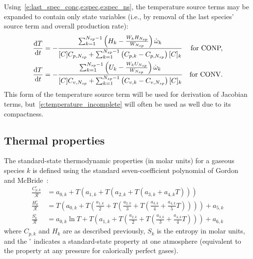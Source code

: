 \documentclass[12pt]{article}
\newcommand{\ns}{N_{sp}}
\newcommand{\conp}{CONP}
\newcommand{\conv}{CONV}
\newcommand{\dconp}{\ifmmode\text{for \conp,}\else for \conp,\fi}
\newcommand{\dconv}{\ifmmode\text{for \conv,}\else for \conv.\fi}
\begin{document}
Using~\cref{e:last_spec_conc,e:spec,e:spec_ns}, the temperature source terms may be expanded to contain only state variables (i.e., by removal of the last species' source term and overall production rate):
\begin{subequations}
\label{e:temperature_complete}
\begin{align}
\frac{\text{d} T }{\text{d} t } &= - \frac{\sum_{k=1}^{\ns  - 1} \left(H_{k} - \frac{W_{k} H_{\ns}}{W_{\ns}}\right) \dot{\omega}_{k}}{[C] {C_{p,\ns}} + \sum_{k=1}^{\ns  - 1} \left({C_{p, k}} - {C_{p,\ns}}\right) [C]_{k}} &\text{\dconp}\\
\frac{\text{d} T }{\text{d} t } &= - \frac{\sum_{k=1}^{\ns  - 1} \left(U_{k} - \frac{W_{k} U_{\ns}}{W_{\ns}}\right) \dot{\omega}_{k}}{[C] {C_{v,\ns}} + \sum_{k=1}^{\ns  - 1} \left({C_{v, k}} - {C_{v,\ns}}\right) [C]_{k}} &\text{\dconv}
\end{align}
\end{subequations}
This form of the temperature source term will be used for derivation of Jacobian terms, but~\cref{e:temperature_incomplete} will often be used as well due to its compactness.

\subsection{Thermal properties}
The standard-state thermodynamic properties (in molar units) for a gaseous species $k$ is defined using the standard seven-coefficient polynomial of Gordon and McBride~\cite{gordon1994computer}:
\begin{align}
\frac{C_{p,k}^{\circ}}{\mathcal{R}} &= a_{0,k} + T \left( a_{1,k} + T \left( a_{2,k} + T \left( a_{3,k} + a_{4,k} T \right) \right) \right) \label{e:cpk} \\
\frac{H_k^{\circ}}{\mathcal{R}} &= T \left( a_{0,k} + T \left( \frac{a_{1,k}}{2} + T \left( \frac{a_{2,k}}{3} + T \left( \frac{a_{3,k}}{4} + \frac{a_{4,k}}{5} T \right) \right) \right) \right) + a_{5,k} \label{e:hk} \\
\frac{S_k^{\circ}}{\mathcal{R}} &= a_{0,k} \ln T + T \left( a_{1,k} + T \left( \frac{a_{2,k}}{2} + T \left( \frac{a_{3,k}}{3} + \frac{a_{4,k}}{4} T \right) \right) \right) + a_{6,k} \label{e:sk}
\end{align}
where $C_{p,k}$ and $H_k$ are as described previously, $S_k$ is the entropy in molar units, and the ${}^{\circ}$ indicates a standard-state property at one atmosphere (equivalent to the property at any pressure for calorically perfect gases).
\end{document}

